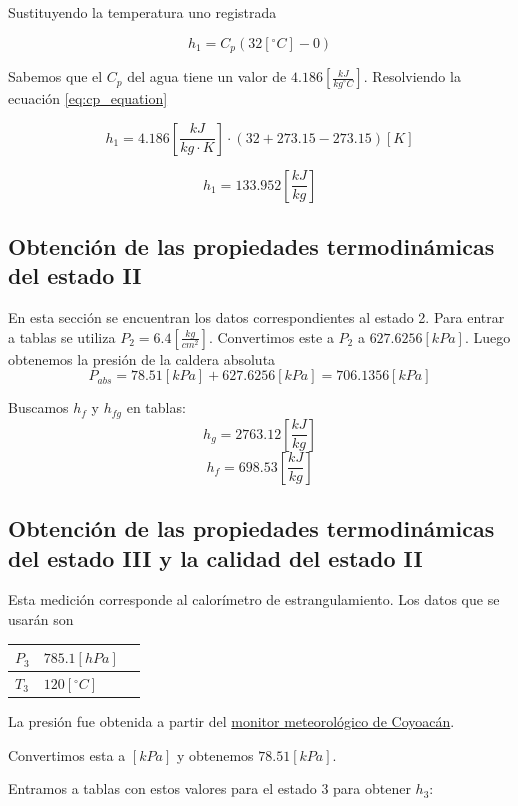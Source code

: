 \documentclass[12pt,letterpaper]{article}
\begin{document}
Sustituyendo la temperatura uno registrada

$$
    h_{1}=C_p (32[ ^\circ C] - 0)  
$$

Sabemos que el $C_p$ del agua tiene un valor de $4.186[\frac{kJ}{kg ^\circ C}]$. 
Resolviendo la ecuación \ref{eq:cp_equation}

$$
    h_1 = 4.186[\frac{kJ}{kg\cdot K}] \cdot (32+273.15-273.15)[K]
$$

$$
    h_1 = 133.952 [\frac{kJ}{kg}]
$$

\subsection{Obtención de las propiedades termodinámicas del estado II} \label{stateII}

En esta sección se encuentran los datos correspondientes al estado 2.
Para entrar a tablas se utiliza $P_2 = 6.4[\frac{kg}{cm^2}]$. 
Convertimos este a $P_2$ a $627.6256[kPa]$. 
Luego obtenemos la presión de la caldera absoluta 
$$
    P_{abs} = 78.51[kPa] + 627.6256[kPa] = 706.1356[kPa]
$$

Buscamos $h_f$ y $h_{fg}$ en tablas:
$$
    h_{g} = 2763.12 \left[\frac{kJ}{kg}\right]
$$
$$
    h_{f} = 698.53 \left[\frac{kJ}{kg}\right]
$$

\subsection{Obtención de las propiedades termodinámicas del estado III 
                y la calidad del estado II} \label{x_calorimetro_estrangulamiento}

Esta medición corresponde al calorímetro de estrangulamiento. Los datos que se usarán son

\begin{tabularx}{0.8\textwidth} { 
  | >{\raggedright\arraybackslash}X 
  | >{\centering\arraybackslash}X 
  | >{\raggedleft\arraybackslash}X | }
 \hline
 $P_3$ & $785.1[hPa]$  \\
 \hline
 $T_3$ & $120[^\circ C]$  \\
\hline
\end{tabularx}

La presión fue obtenida a partir del \href{http://189.254.33.151/stn/coyoacan/Current_Monitor.htm}{monitor meteorológico de Coyoacán}.

Convertimos esta a $[kPa]$ y obtenemos $78.51[kPa]$.

Entramos a tablas con estos valores para el estado 3 para obtener $h_3$:
\end{document}
